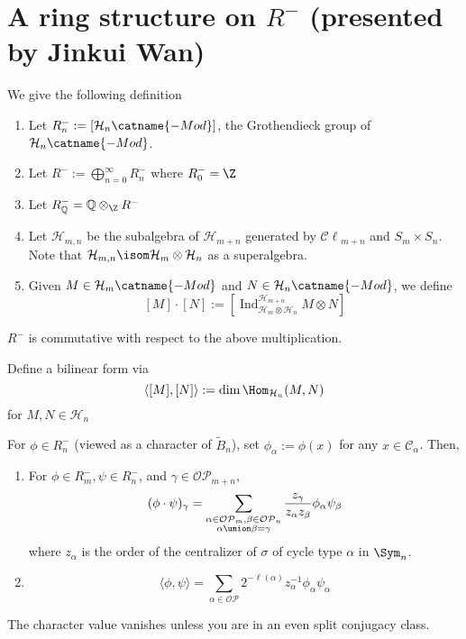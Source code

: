 \documentclass[11pt,leqno,oneside]{amsbook}
\newcommand{\Ind}{\operatorname{Ind}}
\renewcommand{\H}{\mathcal{H}}
\newcommand{\Cl}{\mathcal{C\ell}} %
\newcommand{\OP}{\mathcal{OP}} %
\newcommand{\CC}{\mathcal{C}} %
\numberwithin{thm}{section}
\begin{document}
\section{A ring structure on \(R^-\) (presented by Jinkui Wan)}
\begin{defn}
  We give the following definition
  \begin{enumerate}
  \item Let \(R_n^- := [\H_n\catname{-Mod}]\), the Grothendieck group
    of \(\H_n\catname{-Mod}\).
  \item Let \(R^- := \bigoplus_{n=0}^\infty R_n^-\) where \(R_0^- =
    \Z\)
  \item Let \(R^-_{\mathbb{Q}} = \mathbb{Q} \otimes_\Z R^-\)
  \item Let \(\H_{m,n}\) be the subalgebra of \(\H_{m+n}\) generated
    by \(\Cl_{m+n}\) and \(S_m \times S_n\). Note that \(\H_{m,n}
    \isom \H_m \otimes \H_n\) as a superalgebra.
  \item Given \(M \in \H_m\catname{-Mod}\) and \(N \in
    \H_n\catname{-Mod}\), we define \[
      [M] \cdot [N] := [\Ind_{\H_m \otimes \H_n}^{\H_{m+n}} M \otimes N]
    \]
  \end{enumerate}
\end{defn}
\begin{prop}
  \(R^-\) is commutative with respect to the above multiplication.
\end{prop}
\begin{defn}
  Define a bilinear form via \[
    \langle [M],[N] \rangle := \dim \Hom_{\H_n}(M,N)
  \]
  for \(M,N \in \H_n\)
\end{defn}
\begin{lem}
  For \(\phi \in R_n^-\) (viewed as a character of \(\tilde{B}_n\)),
  set \(\phi_\alpha := \phi(x)\) for any \(x \in \CC_\alpha\). Then,
  \begin{enumerate}
  \item For \(\phi \in R_m^-, \psi \in R_n^-\), and \(\gamma \in
    \OP_{m+n}\), \[
      (\phi \cdot \psi)_\gamma = \sum_{\substack{\alpha \in \OP_m,
          \beta \in \OP_n \\ \alpha \union \beta = \gamma}}
      \frac{z_\gamma}{z_\alpha z_\beta} \phi_\alpha \psi_\beta
    \]
    where \(z_\alpha\) is the order of the centralizer of \(\sigma\)
    of cycle type \(\alpha\) in \(\Sym_n\).
  \item \[
      \langle \phi, \psi \rangle = \sum_{\alpha \in \OP}
      2^{-\ell(\alpha)} z_\alpha^{-1} \phi_\alpha \psi_\alpha
    \]
  \end{enumerate}
\end{lem}
\begin{prop}
  The character value vanishes unless you are in an even split
  conjugacy class.
\end{prop}
\end{document}

